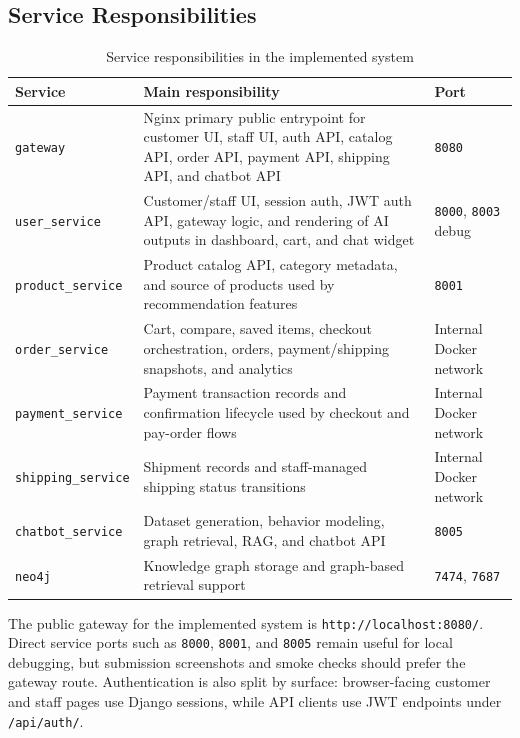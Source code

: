 \documentclass[12pt,a4paper]{article}
\begin{document}
\subsection{Service Responsibilities}
\begin{table}[H]
\centering
\caption{Service responsibilities in the implemented system}
\begin{tabularx}{\linewidth}{>{\raggedright\arraybackslash}p{3cm} >{\raggedright\arraybackslash}X >{\raggedright\arraybackslash}p{2.3cm}}
\toprule
Service & Main responsibility & Port \\
\midrule
\texttt{gateway} & Nginx primary public entrypoint for customer UI, staff UI, auth API, catalog API, order API, payment API, shipping API, and chatbot API & \texttt{8080} \\
\texttt{user\_service} & Customer/staff UI, session auth, JWT auth API, gateway logic, and rendering of AI outputs in dashboard, cart, and chat widget & \texttt{8000}, \texttt{8003} debug \\
\texttt{product\_service} & Product catalog API, category metadata, and source of products used by recommendation features & \texttt{8001} \\
\texttt{order\_service} & Cart, compare, saved items, checkout orchestration, orders, payment/shipping snapshots, and analytics & Internal Docker network \\
\texttt{payment\_service} & Payment transaction records and confirmation lifecycle used by checkout and pay-order flows & Internal Docker network \\
\texttt{shipping\_service} & Shipment records and staff-managed shipping status transitions & Internal Docker network \\
\texttt{chatbot\_service} & Dataset generation, behavior modeling, graph retrieval, RAG, and chatbot API & \texttt{8005} \\
\texttt{neo4j} & Knowledge graph storage and graph-based retrieval support & \texttt{7474}, \texttt{7687} \\
\bottomrule
\end{tabularx}
\end{table}

The public gateway for the implemented system is \texttt{http://localhost:8080/}. Direct service ports such as \texttt{8000}, \texttt{8001}, and \texttt{8005} remain useful for local debugging, but submission screenshots and smoke checks should prefer the gateway route. Authentication is also split by surface: browser-facing customer and staff pages use Django sessions, while API clients use JWT endpoints under \texttt{/api/auth/}.
\end{document}
